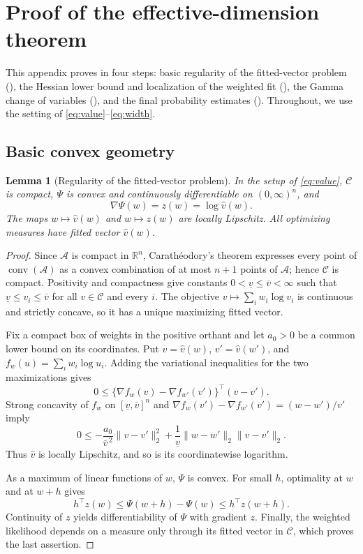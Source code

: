 \documentclass[11pt]{article}
\newtheorem{lemma}{Lemma}
\theoremstyle{definition}
\theoremstyle{remark}
\DeclareMathOperator{\conv}{conv}
\newcommand{\Ccal}{\mathcal C}
\newcommand{\Acal}{\mathcal A}
\newcommand{\RR}{\mathbb R}
\newcommand{\norm}[1]{\lVert #1\rVert}
\newcommand{\vhat}{\widehat v}
\begin{document}
\section{Proof of the effective-dimension theorem}
\label{app:effective}

This appendix proves  in four steps: basic regularity
of the fitted-vector problem (), the Hessian
lower bound and localization of the weighted fit
(), the Gamma change of variables
(), and the final probability estimates
().  Throughout, we use the setting of
\eqref{eq:value}--\eqref{eq:width}.

\subsection{Basic convex geometry}
\label{app:effective-basic}

\begin{lemma}[Regularity of the fitted-vector problem]
\label{lem:regularity}
In the setup of \eqref{eq:value}, $\Ccal$ is compact,
$\Psi$ is convex and continuously differentiable on $(0,\infty)^n$, and
\[
 \nabla\Psi(w)=z(w)=\log\vhat(w).
\]
The maps $w\mapsto\vhat(w)$ and $w\mapsto z(w)$ are locally Lipschitz.
All optimizing measures have fitted vector $\vhat(w)$.
\end{lemma}

\begin{proof}
Since $\Acal$ is compact in $\RR^n$, Carath\'eodory's theorem expresses
every point of $\conv(\Acal)$ as a convex combination of at most $n+1$
points of $\Acal$; hence $\Ccal$ is compact.  Positivity and compactness give
constants $0<\underline v\le\overline v<\infty$ such that
$\underline v\le v_i\le\overline v$ for all $v\in\Ccal$ and every $i$.  The
objective $v\mapsto\sum_iw_i\log v_i$ is continuous and strictly concave, so
it has a unique maximizing fitted vector.

Fix a compact box of weights in the positive
orthant and let $a_0>0$ be a common lower bound on its coordinates.  Put
$v=\vhat(w)$, $v'=\vhat(w')$, and $f_w(u)=\sum_iw_i\log u_i$.  Adding the
variational inequalities for the two maximizations gives
\[
 0\le\{\nabla f_w(v)-\nabla f_{w'}(v')\}^\top(v-v').
\]
Strong concavity of $f_w$ on $[\underline v,\overline v]^n$ and
$\nabla f_w(v')-\nabla f_{w'}(v')=(w-w')/v'$ imply
\[
 0\le-\frac{a_0}{\overline v^{\,2}}\norm{v-v'}_2^2
       +\frac1{\underline v}\norm{w-w'}_2\norm{v-v'}_2.
\]
Thus $\vhat$ is locally Lipschitz, and so is its coordinatewise logarithm.

As a maximum of linear functions of $w$, $\Psi$
is convex.  For small $h$, optimality at $w$ and at $w+h$ gives
\[
 h^\top z(w)\le\Psi(w+h)-\Psi(w)\le h^\top z(w+h).
\]
Continuity of $z$ yields differentiability of $\Psi$ with gradient $z$.
Finally, the weighted likelihood depends on a measure only through its
fitted vector in $\Ccal$, which proves the last assertion.
\end{proof}
\end{document}
